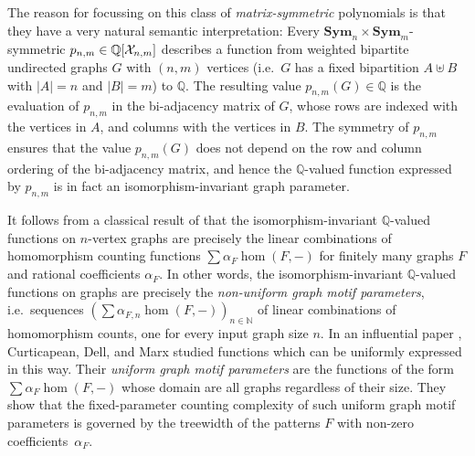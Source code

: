 \documentclass[10pt,a4paper]{article}
\theoremstyle{definition}
\theoremstyle{plain}
\theoremstyle{remark}
\newcommand{\Xx}{{\cal X}}
\newcommand{\Sym}{\mathbf{Sym}}
\newcommand{\bbN}{\mathbb{N}}
\newcommand{\bbQ}{\mathbb{Q}}
\begin{document}
The reason for focussing on this class of \emph{matrix-symmetric} polynomials is that they have a very natural semantic interpretation: Every $\Sym_n \times \Sym_m$-symmetric $p_{n,m} \in \bbQ[\Xx_{n,m}]$ describes a function from weighted bipartite undirected graphs $G$ with $(n,m)$ vertices (i.e.\ $G$ has a fixed bipartition $A \uplus B$ with $|A| = n$ and $|B| = m$) to $\bbQ$. The resulting value $p_{n,m}(G) \in \bbQ$ is the evaluation of $p_{n,m}$ in the bi-adjacency matrix of $G$, whose rows are indexed with the vertices in $A$, and columns with the vertices in $B$. The symmetry of $p_{n,m}$ ensures that the value $p_{n,m}(G)$ does not depend on the row and column ordering of the bi-adjacency matrix, and hence the $\bbQ$-valued function expressed by $p_{n,m}$ is in fact an isomorphism-invariant graph parameter. 

It follows from a classical result of \textcite{lovasz_operations_1967} that the isomorphism-invariant $\mathbb{Q}$-valued functions on $n$-vertex graphs are precisely the linear combinations of homomorphism counting functions $\sum \alpha_F \hom(F, -)$ for finitely many graphs $F$ and rational coefficients $\alpha_F$. 
In other words,
the isomorphism-invariant $\mathbb{Q}$-valued functions on graphs are precisely the \emph{non-uniform graph motif parameters}, i.e.\ sequences $(\sum \alpha_{F, n} \hom(F, -))_{n \in \mathbb{N}}$ of linear combinations of homomorphism counts, one for every input graph size $n$.
In an influential paper \cite{curticapean_homomorphisms_2017}, Curticapean, Dell, and Marx 
studied functions which can be uniformly expressed in this way.
Their \emph{uniform graph motif parameters} are the functions of the form $\sum \alpha_F \hom(F, -)$ whose domain are all graphs regardless of their size.
They show that the fixed-parameter counting complexity of such uniform graph motif parameters is governed by the treewidth of the patterns $F$ with non-zero coefficients~$\alpha_F$.
\end{document}
